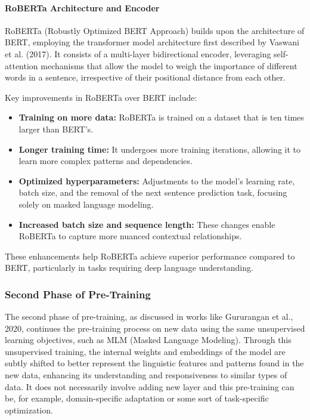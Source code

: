 \documentclass[12pt]{article}
\begin{document}
\paragraph{RoBERTa Architecture and Encoder}
RoBERTa (Robustly Optimized BERT Approach) builds upon the architecture of BERT, employing the transformer model architecture first described by Vaswani et al. (2017). It consists of a multi-layer bidirectional encoder, leveraging self-attention mechanisms that allow the model to weigh the importance of different words in a sentence, irrespective of their positional distance from each other.

Key improvements in RoBERTa over BERT include:
\begin{itemize}
    \item \textbf{Training on more data:} RoBERTa is trained on a dataset that is ten times larger than BERT’s.
    \item \textbf{Longer training time:} It undergoes more training iterations, allowing it to learn more complex patterns and dependencies.
    \item \textbf{Optimized hyperparameters:} Adjustments to the model’s learning rate, batch size, and the removal of the next sentence prediction task, focusing solely on masked language modeling.
    \item \textbf{Increased batch size and sequence length:} These changes enable RoBERTa to capture more nuanced contextual relationships.
\end{itemize}
These enhancements help RoBERTa achieve superior performance compared to BERT, particularly in tasks requiring deep language understanding.

\subsubsection{Second Phase of Pre-Training}
The second phase of pre-training, as discussed in works like Gururangan et al., 2020, continues the pre-training process on new data using the same unsupervised learning objectives, such as MLM (Masked Language Modeling). Through this unsupervised training, the internal weights and embeddings of the model are subtly shifted to better represent the linguistic features and patterns found in the new data, enhancing its understanding and responsiveness to similar types of data. It does not necessarily involve adding new layer and this pre-training can be, for example, domain-specific adaptation or some sort of task-specific optimization. 
\end{document}

